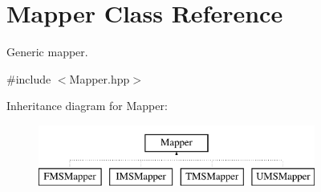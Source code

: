 \hypertarget{classMapper}{
\section{Mapper Class Reference}
\label{classMapper}
}


Generic mapper.  




{\ttfamily \#include $<$Mapper.hpp$>$}

Inheritance diagram for Mapper:\begin{figure}[H]
\begin{center}
\leavevmode
\includegraphics[height=2.000000cm]{classMapper}
\end{center}
\end{figure}
